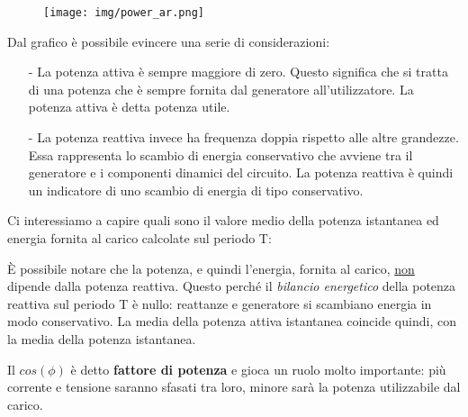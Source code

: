 \documentclass{article}
\begin{document}
\begin{figure}[h!]
    \begin{center}
        \texttt{[image: img/power\_ar.png]}
    \end{center}
\end{figure}

\noindent Dal grafico è possibile evincere una serie di considerazioni:
\begin{itemize}
    \item[-] La potenza attiva è sempre maggiore di zero. Questo significa che si tratta di una potenza che è sempre fornita dal generatore 
    all'utilizzatore. La potenza attiva è detta potenza utile.
    \item[-] La potenza reattiva invece ha frequenza doppia rispetto alle altre grandezze. Essa rappresenta lo scambio di energia conservativo 
    che avviene tra il generatore e i componenti dinamici del circuito. La potenza reattiva è quindi un indicatore
    di uno scambio di energia di tipo conservativo.
\end{itemize}

\noindent Ci interessiamo a capire quali sono il valore medio della potenza istantanea ed energia fornita al carico calcolate sul periodo T:

\medskip
\noindent{}
\medskip

\noindent È possibile notare che la potenza, e quindi l'energia, fornita al carico, \underline{non} dipende dalla potenza reattiva.
Questo perché il \textit{bilancio energetico} della potenza reattiva sul periodo T è nullo: reattanze e generatore si scambiano energia in modo 
conservativo. La media della potenza attiva istantanea coincide quindi, con la media della potenza istantanea.
\medskip

\noindent Il $cos(\phi)$ è detto \textbf{fattore di potenza} e gioca un ruolo molto importante: più corrente e tensione saranno sfasati tra loro,
minore sarà la potenza utilizzabile dal carico.
\end{document}
